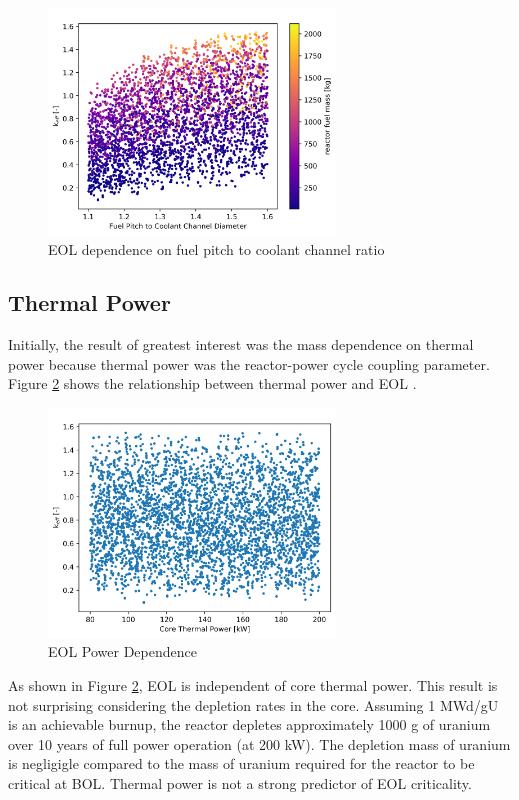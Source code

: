 \begin{figure}[h]
    \centering
    \includegraphics[width=3in]{../images/keff_vs_PD_mass.png}
\caption{EOL \keff dependence on fuel pitch to coolant channel ratio}
\label{fig:eol_keff_vs_PD_mass}
\end{figure}


\subsection{Thermal Power}
Initially, the result of greatest interest was the mass dependence on thermal
power because thermal power was the reactor-power cycle coupling parameter.
Figure \ref{fig:eol_keff_vs_power} shows the relationship between thermal power
and EOL \keff.

\begin{figure}[h]
    \centering
    \includegraphics[width=3in]{../images/keff_vs_power.png}
\caption{EOL \keff Power Dependence}
\label{fig:eol_keff_vs_power}
\end{figure}

As shown in Figure \ref{fig:eol_keff_vs_power}, EOL \keff is independent of core
thermal power. This result is not surprising considering the depletion rates in
the core. Assuming 1 MWd/gU is an achievable burnup, the reactor depletes
approximately 1000 g of uranium over 10 years of full power operation (at 200
kW). The depletion mass
of uranium is negligigle compared to the mass of uranium required for the
reactor to be critical at BOL. Thermal power is not a strong predictor of EOL
criticality.

